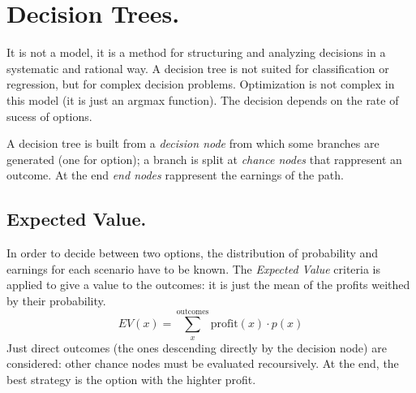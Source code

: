 \documentclass[11pt, twocolumn]{article}
\begin{document}
\section{Decision Trees.}
It is not a model, it is a method for structuring and analyzing decisions in a systematic and rational way.
A decision tree is not suited for classification or regression, but for complex decision problems.
Optimization is not complex in this model (it is just an argmax function).
The decision depends on the rate of sucess of options.

A decision tree is built from a \textit{decision node} from which some branches are generated (one for option); a branch is split at \textit{chance nodes} that rappresent an outcome.
At the end \textit{end nodes} rappresent the earnings of the path.

\subsection{Expected Value.}
In order to decide between two options, the distribution of probability and earnings for each scenario have to be known.
The \textit{Expected Value} criteria is applied to give a value to the outcomes: it is just the mean of the profits weithed by their probability.
\begin{equation*}
  EV (x) = \sum_x^{\text{outcomes}}\text{profit}(x) \cdot p(x)
\end{equation*}
Just direct outcomes (the ones descending directly by the decision node) are considered: other chance nodes must be evaluated recoursively.
At the end, the best strategy is the option with the highter profit.
\end{document}

